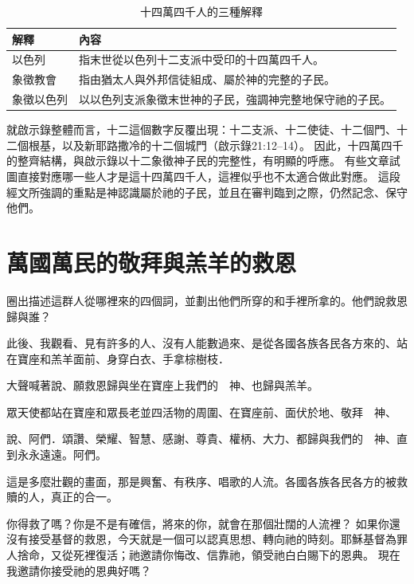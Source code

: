 \begin{table}[htbp]
\centering
\renewcommand{\arraystretch}{1}
\caption{十四萬四千人的三種解釋}
\label{tab:144000-zh}
\begin{tabular}{p{2.2cm} p{6.8cm}}
\hline
解釋 & 內容 \\
\hline
以色列 & 指末世從以色列十二支派中受印的十四萬四千人。 \\
象徵教會 & 指由猶太人與外邦信徒組成、屬於神的完整的子民。 \\
象徵以色列 & 以以色列支派象徵末世神的子民，強調神完整地保守祂的子民。 \\
\hline
\end{tabular}
\end{table}





就啟示錄整體而言，十二這個數字反覆出現：十二支派、十二使徒、十二個門、十二個根基，以及新耶路撒冷的十二個城門（啟示錄21:12--14）。
因此，十四萬四千的整齊結構，與啟示錄以十二象徵神子民的完整性，有明顯的呼應。
有些文章試圖直接對應哪一些人才是這十四萬四千人，這裡似乎也不太適合做此對應。
這段經文所強調的重點是神認識屬於祂的子民，並且在審判臨到之際，仍然記念、保守他們。

\section{萬國萬民的敬拜與羔羊的救恩}

\begin{ScriptureBox2}{圈出描述這群人從哪裡來的四個詞，並劃出他們所穿的和手裡所拿的。他們說救恩歸與誰？}
\item[7:9] 此後、我觀看、見有許多的人、沒有人能數過來、是從各國各族各民各方來的、站在寶座和羔羊面前、身穿白衣、手拿棕樹枝．

\item[7:10] 大聲喊著說、願救恩歸與坐在寶座上我們的　神、也歸與羔羊。

\item[7:11] 眾天使都站在寶座和眾長老並四活物的周圍、在寶座前、面伏於地、敬拜　神、

\item[7:12] 說、阿們．頌讚、榮耀、智慧、感謝、尊貴、權柄、大力、都歸與我們的　神、直到永永遠遠。阿們。
\end{ScriptureBox2}

這是多麼壯觀的畫面，那是興奮、有秩序、唱歌的人流。各國各族各民各方的被救贖的人，真正的合一。

\begin{ReaderQuestion}
你得救了嗎？你是不是有確信，將來的你，就會在那個壯闊的人流裡？
如果你還沒有接受基督的救恩，今天就是一個可以認真思想、轉向祂的時刻。耶穌基督為罪人捨命，又從死裡復活；祂邀請你悔改、信靠祂，領受祂白白賜下的恩典。
現在我邀請你接受祂的恩典好嗎？
\end{ReaderQuestion}

